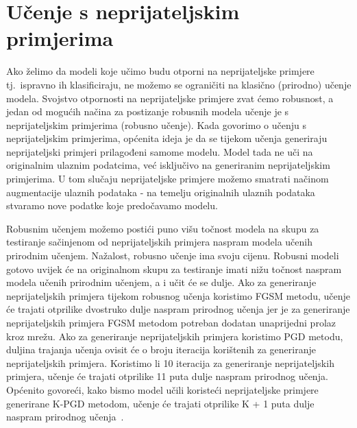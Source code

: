 \documentclass[times, utf8, zavrsni, numeric]{fer}
\begin{document}
\section{Učenje s neprijateljskim primjerima}

Ako želimo da modeli koje učimo budu otporni na neprijateljske primjere tj.\ ispravno ih klasificiraju, ne možemo se ograničiti na klasično (prirodno) učenje modela.
Svojstvo otpornosti na neprijateljske primjere zvat ćemo robusnost, a jedan od mogućih načina za postizanje robusnih modela učenje je s neprijateljskim primjerima (robusno učenje).
Kada govorimo o učenju s neprijateljskim primjerima, općenita ideja je da se tijekom učenja generiraju neprijateljski primjeri prilagođeni samome modelu.
Model tada ne uči na originalnim ulaznim podatcima, već isključivo na generiranim neprijateljskim primjerima.
U tom slučaju neprijateljske primjere možemo smatrati načinom augmentacije ulaznih podataka - na temelju originalnih ulaznih podataka stvaramo nove podatke koje predočavamo modelu.

Robusnim učenjem možemo postići puno višu točnost modela na skupu za testiranje sačinjenom od neprijateljskih primjera naspram modela učenih prirodnim učenjem.
Nažalost, robusno učenje ima svoju cijenu. Robusni modeli gotovo uvijek će na originalnom skupu za testiranje imati nižu točnost naspram modela učenih prirodnim učenjem,
a i učit će se dulje. Ako za generiranje neprijateljskih primjera tijekom robusnog učenja koristimo FGSM metodu, učenje će trajati otprilike dvostruko dulje naspram prirodnog učenja
jer je za generiranje neprijateljskih primjera FGSM metodom potreban dodatan unaprijedni prolaz kroz mrežu. 
Ako za generiranje neprijateljskih primjera koristimo PGD metodu, duljina trajanja učenja ovisit će o broju iteracija korištenih za generiranje neprijateljskih primjera.
Koristimo li 10 iteracija za generiranje neprijateljskih primjera, učenje će trajati otprilike 11 puta dulje naspram prirodnog učenja. 
Općenito govoreći, kako bismo model učili koristeći neprijateljske primjere generirane K-PGD metodom, učenje će trajati otprilike K + 1 puta dulje naspram prirodnog učenja~\cite{shafahi2019adversarial}.

\pagebreak
\end{document}
